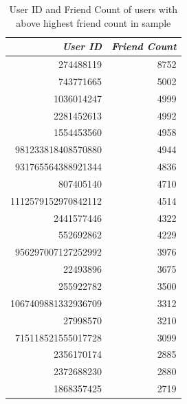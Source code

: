 \documentclass[11pt]{article}
\begin{document}
\begin{table}[htbp]
\caption{\label{tab:org89fe1a8}User ID and Friend Count of users with above highest friend count in sample}
\centering
\begin{tabular}{rr}
\textbf{\emph{User ID}} & \textbf{\emph{Friend Count}}\\
\hline
274488119 & 8752\\
743771665 & 5002\\
1036014247 & 4999\\
2281452613 & 4992\\
1554453560 & 4958\\
981233818408570880 & 4944\\
931765564388921344 & 4836\\
807405140 & 4710\\
1112579152970842112 & 4514\\
2441577446 & 4322\\
552692862 & 4229\\
956297007127252992 & 3976\\
22493896 & 3675\\
255922782 & 3500\\
1067409881332936709 & 3312\\
27998570 & 3210\\
715118521555017728 & 3099\\
2356170174 & 2885\\
2372688230 & 2880\\
1868357425 & 2719\\
\end{tabular}
\end{table}
\end{document}
